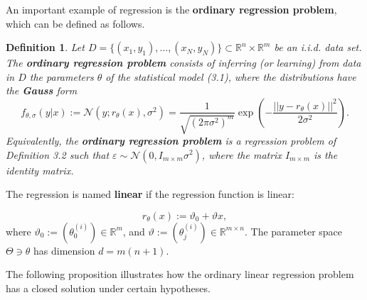 \documentclass{report}
\newtheorem{definition}{Definition}[chapter]
\begin{document}
An important example of regression is the \textbf{ordinary regression problem}, which can be defined as follows.

\begin{definition}
Let $D = \{(x_1,y_1),\dots,(x_N,y_N)\} \subset \mathbb{R}^n \times \mathbb{R}^m$ be an i.i.d. data set. The \textbf{ordinary regression problem} consists of inferring (or learning) from data in $D$ the parameters $\theta$ of the statistical model (3.1), where the distributions have the \textbf{Gauss} form
\begin{equation}
f_{\theta,\sigma}(y|x) := \mathcal{N}(y;r_\theta(x),\sigma^2) = \frac{1}{\sqrt{(2\pi\sigma^2)^m}}\exp\left(-\frac{||y-r_\theta(x)||^2}{2\sigma^2}\right).
\end{equation}
Equivalently, the \textbf{ordinary 
regression problem} is a regression problem of Definition 3.2 such that $\varepsilon \sim \mathcal{N}(0,I_{m\times m}\sigma^2)$, where the matrix $I_{m\times m}$ is the identity matrix.
\end{definition}

The regression is named \textbf{linear} if the regression function is linear:

\begin{equation}
r_\theta(x) :=  \vartheta_0 + \vartheta x,
\end{equation}
where $\vartheta_0 := (\theta_0^{(i)}) \in \mathbb{R}^m$, and $\vartheta := (\theta_j^{(i)}) \in \mathbb{R}^{m \times n}$. The parameter space $\Theta \ni \theta$ has dimension $d = m(n+1)$.

The following proposition illustrates how the ordinary linear regression problem has a closed solution under certain hypotheses.
\end{document}
